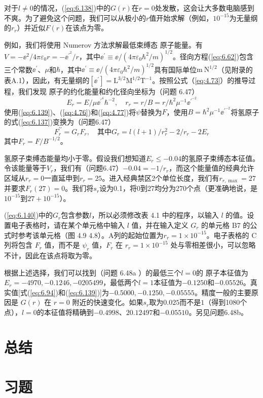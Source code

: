     对于$l\neq 0$的情况，(\ref{eq:6.138})中的$G\left(r\right)$在$r=0$处发散，这会让大多数电脑感到不爽。为了避免这个问题，我们可以从极小的$r$值开始求解（例如，$10^{-15}$为无量纲的$r_r$）并近似$F\left(r\right)$在该点为零。

    例如，我们将使用 Numerov 方法求解最低束缚态  原子能量。有$V = -\ee ^2/4\pi\varepsilon_0r = -\ee ^{\prime^2}/r$，其中$\ee ^{\prime} \equiv \ee /\left(4\pi\varepsilon_0\hbar^2/m\right)^{1/2}$。径向方程(\ref{eq:6.62})包含三个常数$\ee ^{\prime}$、$\mu$和$\hbar$，其中$\ee ^{\prime} \equiv \ee /\left(4\pi\varepsilon_0\hbar^2/m\right)^{1/2}$具有国际单位$\mathrm{m}\: \mathrm{N}^{1/2}$（见附录的表A.1），因此，有无量纲的$\left[\ee ^{\prime}\right] = \mathrm{L}^{3/2}\mathrm{M}^{1/2}\mathrm{T}^{-1}$。按照公式（\ref{eq:4.73}）的推导过程，我们发现  原子的约化能量和约化径向坐标为（问题 6.47）
    \begin{equation}
        E_r = E/\mu \ee ^{\prime ^4}\hbar^{-2}, \quad r_r = r/B = r/\hbar^2\mu^{-1}\ee ^{\prime ^{-2}}
        \label{eq:6.139}
    \end{equation}
    使用(\ref{eq:6.139})、(\ref{eq:4.76})和(\ref{eq:4.77})将$\psi$替换为$F$，使用$B = \hbar^2\mu^{-1}\ee ^{\prime ^{-2}}$将氢原子的式(\ref{eq:6.137})变换为（问题6.47）
    \begin{equation}
        F^{\prime\prime}_r = G_rF_r, \quad \text{其中}G_r = l\left(l+1\right)/r_r^2 - 2/r_r -2E_r
        \label{eq:6.140}
    \end{equation}
    其中$F_r = F/B^{-1/2}$。

    氢原子束缚态能量均小于零。假设我们想知道$E_r \leq -0.04$的氢原子束缚态本征值。令该能量等于$V_r$，我们有（问题6.47）$-0.04 = -1/r_r$，而这个能量值的经典允许区域从$r_r = 0$一直延申到$r_r = 25$。进入经典禁区2个单位长度，我们有$r_{r,\max} = 27$并要求$F_r\left(27\right)=0$。我们将$s_r$设为0.1，将0到27均分为270个点（更准确地说，是$10^{-15}$到$27+10^{-15}$）。

    (\ref{eq:6.140})中的$G_r$包含参数$l$，所以必须修改表 4.1 中的程序，以输入 $l$ 的值。设置电子表格时，请在某个单元格中输入 $l$ 值，并在输入定义 $G_r$ 的单元格 B7 的公式时参考该单元格（图 4.9 4.8）。A列的起始位置为$r_r = 1\times 10^{-15}$。电子表格的 C 列将包含 $F_r$ 值，而不是 $\psi_r$ 值，$F_r$ 在 $r_r = 1\times10^{-15}$ 处与零相差很小，可以忽略不计，因此在该点将取为零。

    根据上述选择，我们可以找到（问题 6.48a ）的最低三个$l=0$的  原子本征值为$E_r = -4970,-0.1246,-0205499$，最低两个$l=1$本征值为$-0.1250$和$-0.05526$。真实值[式(\ref{eq:6.94})和(\ref{eq:6.139})]为$-0.5000,-0.1250,-0.05555$。精度一般的主要原因是 $G\left(r\right)$ 在 $r=0$ 附近的快速变化。如果$s_r$取为$0.025$而不是$1$（得到1080个点），$l=0$的本征值将精确到$-0.4998$、$20.12497$和$-0.05510$。另见问题6.48b。

\section*{总结}

\section*{习题}

